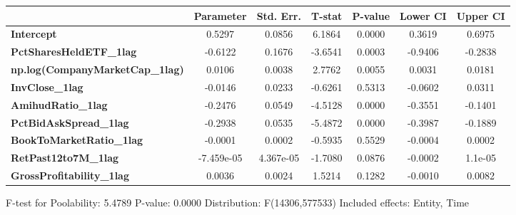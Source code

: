 \begin{center}
\begin{tabular}{lclc}
\bottomrule
\end{tabular}
\begin{tabular}{lcccccc}
                                        & \textbf{Parameter} & \textbf{Std. Err.} & \textbf{T-stat} & \textbf{P-value} & \textbf{Lower CI} & \textbf{Upper CI}  \\
\midrule
\textbf{Intercept}                      &       0.5297       &       0.0856       &      6.1864     &      0.0000      &       0.3619      &       0.6975       \\
\textbf{PctSharesHeldETF\_1lag}         &      -0.6122       &       0.1676       &     -3.6541     &      0.0003      &      -0.9406      &      -0.2838       \\
\textbf{np.log(CompanyMarketCap\_1lag)} &       0.0106       &       0.0038       &      2.7762     &      0.0055      &       0.0031      &       0.0181       \\
\textbf{InvClose\_1lag}                 &      -0.0146       &       0.0233       &     -0.6261     &      0.5313      &      -0.0602      &       0.0311       \\
\textbf{AmihudRatio\_1lag}              &      -0.2476       &       0.0549       &     -4.5128     &      0.0000      &      -0.3551      &      -0.1401       \\
\textbf{PctBidAskSpread\_1lag}          &      -0.2938       &       0.0535       &     -5.4872     &      0.0000      &      -0.3987      &      -0.1889       \\
\textbf{BookToMarketRatio\_1lag}        &      -0.0001       &       0.0002       &     -0.5935     &      0.5529      &      -0.0004      &       0.0002       \\
\textbf{RetPast12to7M\_1lag}            &     -7.459e-05     &     4.367e-05      &     -1.7080     &      0.0876      &      -0.0002      &       1.1e-05      \\
\textbf{GrossProfitability\_1lag}       &       0.0036       &       0.0024       &      1.5214     &      0.1282      &      -0.0010      &       0.0082       \\
\bottomrule
\end{tabular}
\end{center}

F-test for Poolability: 5.4789 \newline
 P-value: 0.0000 \newline
 Distribution: F(14306,577533) \newline
  \newline
 Included effects: Entity, Time
